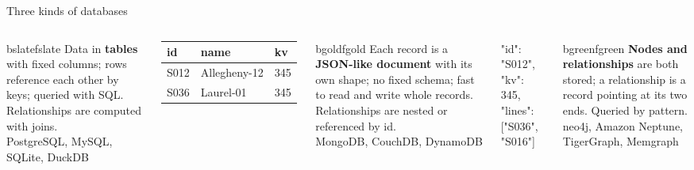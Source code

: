 \documentclass[aspectratio=169, 10pt]{beamer}
\newcommand{\kicker}[1]{{\color{muted}\small #1}}
\begin{document}
\begin{frame}[fragile]{Three kinds of databases}
  \vspace{0.2cm}
  \begin{columns}[T]
      \begin{tbox}[Relational]{bslate}{fslate}
        Data in \textbf{tables} with fixed columns; rows reference each other by keys; queried with SQL. Relationships are computed with joins.\\[3pt]
        \kicker{PostgreSQL, MySQL, SQLite, DuckDB}
      \end{tbox}
      \vspace{0.1cm}
      \centering\scriptsize
      \begin{tabular}{@{}lll@{}}\toprule
        id & name & kv\\ \midrule
        S012 & Allegheny-12 & 345\\
        S036 & Laurel-01 & 345\\ \bottomrule
      \end{tabular}
      \begin{tbox}{bgold}{fgold}
        Each record is a \textbf{JSON-like document} with its own shape; no fixed schema; fast to read and write whole records. Relationships are nested or referenced by id.\\[3pt]
        \kicker{MongoDB, CouchDB, DynamoDB}
      \end{tbox}
      \vspace{0.1cm}
      \begin{code}[json]
{ "id": "S012", "kv": 345,
  "lines": ["S036", "S016"] }
      \end{code}
      \begin{tbox}[Graph]{bgreen}{fgreen}
        \textbf{Nodes and relationships} are both stored; a relationship is a record pointing at its two ends. Queried by pattern.\\[3pt]
        \kicker{neo4j, Amazon Neptune, TigerGraph, Memgraph}
      \end{tbox}
      \vspace{0.1cm}
      \centering
  \end{columns}
\end{frame}
\end{document}
